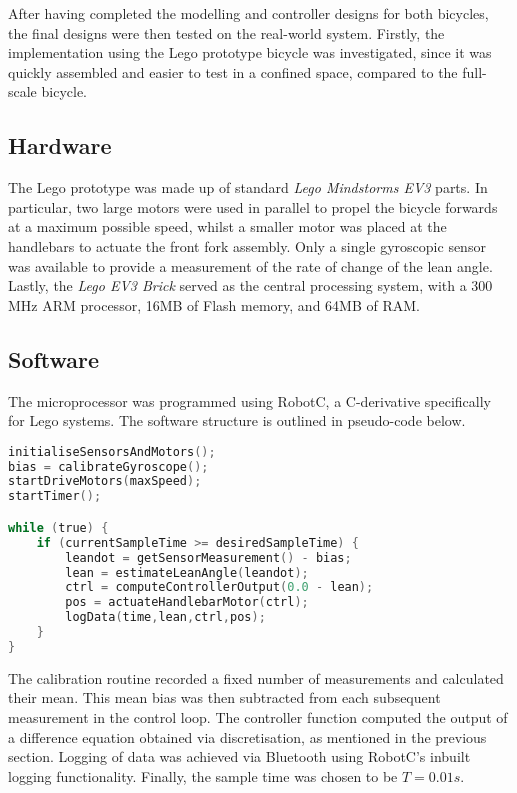 After having completed the modelling and controller designs for both bicycles, the final designs were then tested on the real-world system. Firstly, the implementation using the Lego prototype bicycle was investigated, since it was quickly assembled and easier to test in a confined space, compared to the full-scale bicycle.

\subsection{Hardware}
The Lego prototype was made up of standard \textit{Lego Mindstorms EV3} parts. In particular, two large motors were used in parallel to propel the bicycle forwards at a maximum possible speed, whilst a smaller motor was placed at the handlebars to actuate the front fork assembly. Only a single gyroscopic sensor was available to provide a measurement of the rate of change of the lean angle. Lastly, the \textit{Lego EV3 Brick} served as the central processing system, with a 300 MHz ARM processor, 16MB of Flash memory, and 64MB of RAM.

\subsection{Software} \label{legosoftwaresec}
The microprocessor was programmed using RobotC, a C-derivative specifically for Lego systems. The software structure is outlined in pseudo-code below.

\begin{lstlisting}[language=C, caption=Lego Software Pseudo-Code]
initialiseSensorsAndMotors();
bias = calibrateGyroscope();
startDriveMotors(maxSpeed);
startTimer();

while (true) {
	if (currentSampleTime >= desiredSampleTime) {
		leandot = getSensorMeasurement() - bias;
		lean = estimateLeanAngle(leandot);
		ctrl = computeControllerOutput(0.0 - lean);
		pos = actuateHandlebarMotor(ctrl);
		logData(time,lean,ctrl,pos);
	}
}
\end{lstlisting}

The calibration routine recorded a fixed number of measurements and calculated their mean. This mean bias was then subtracted from each subsequent measurement in the control loop. The controller function computed the output of a difference equation obtained via discretisation, as mentioned in the previous section. Logging of data was achieved via Bluetooth using RobotC's inbuilt logging functionality. Finally, the sample time was chosen to be $T=0.01s$.

